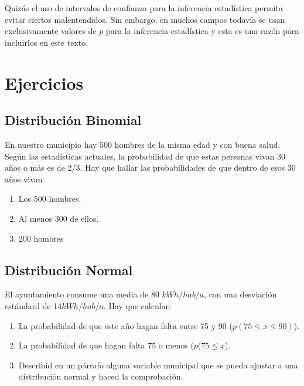 \documentclass[
]{book}
\providecommand{\tightlist}{%
  \setlength{\itemsep}{0pt}\setlength{\parskip}{0pt}}
\begin{document}
Quizás el uso de intervalos de confianza para la inferencia estadística permita evitar ciertos malentendidos. Sin embargo, en muchos campos todavía se usan exclusivamente valores de \(p\) para la inferencia estadística y esta es una razón para incluirlos en este texto.

\hypertarget{ejercicios-2}{%
\section{Ejercicios}\label{ejercicios-2}}

\hypertarget{distribuciuxf3n-binomial}{%
\subsection{Distribución Binomial}\label{distribuciuxf3n-binomial}}

En nuestro municipio hay 500 hombres de la misma edad y con buena salud. Según las estadísticas actuales, la probabilidad de que estas personas vivan 30 años o más es de 2/3. Hay que hallar las probabilidades de que dentro de esos 30 años vivan

\begin{enumerate}
\def\labelenumi{\arabic{enumi}.}
\tightlist
\item
  Los 500 hombres.
\item
  Al menos 300 de ellos.
\item
  200 hombres
\end{enumerate}

\hypertarget{distribuciuxf3n-normal}{%
\subsection{Distribución Normal}\label{distribuciuxf3n-normal}}

El ayuntamiento consume una media de 80 \(kWh/hab/a\), con una desviación estándard de 14\(kWh/hab/a\). Hay que calcular:

\begin{enumerate}
\def\labelenumi{\arabic{enumi}.}
\tightlist
\item
  La probabilidad de que este año hagan falta entre 75 y 90 (\(p(75 \leqslant x \leqslant 90)\)).
\item
  La probabilidad de que hagan falta 75 o menos (\(p(75 \leqslant x\)).
\item
  Describid en un párrafo alguna variable municipal que se pueda ajustar a una distribución normal y haced la comprobación.
\end{enumerate}
\end{document}
